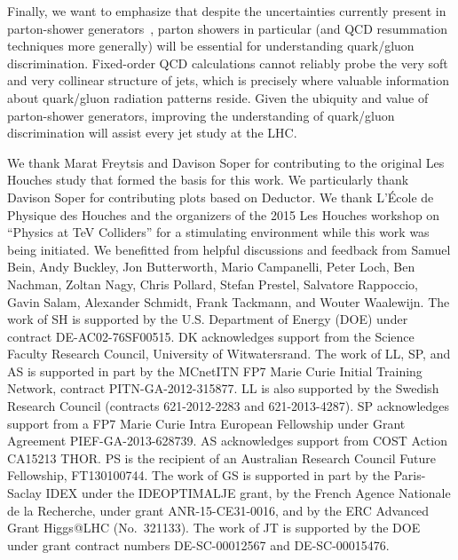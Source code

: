 \documentclass[11pt,letterpaper]{article}
\begin{document}
Finally, we want to emphasize that despite the uncertainties currently present in parton-shower generators~\cite{Bellm:2016rhh,Bellm:2016voq,Mrenna:2016sih,Bothmann:2016nao}, 
parton showers in particular (and QCD resummation techniques more generally) will be essential for understanding quark/gluon discrimination.  Fixed-order QCD calculations cannot reliably probe the very soft and very collinear structure of jets, which is precisely where valuable information about quark/gluon radiation patterns reside.  Given the ubiquity and value of parton-shower generators, improving the understanding of quark/gluon discrimination will assist every jet study at the LHC.

\begin{acknowledgments}

We thank Marat Freytsis and Davison Soper for contributing to the original Les Houches study \cite{Badger:2016bpw} that formed the basis for this work.  We particularly thank Davison Soper for contributing plots based on Deductor.
%
We thank L'\'{E}cole de Physique des Houches and the organizers of the 2015 Les Houches workshop on ``Physics at TeV Colliders'' for a stimulating environment while this work was being initiated.
%
We benefitted from helpful discussions and feedback from Samuel Bein, Andy Buckley, Jon Butterworth, Mario Campanelli, Peter Loch, Ben Nachman, Zoltan Nagy, Chris Pollard, Stefan Prestel, Salvatore Rappoccio, Gavin Salam, Alexander Schmidt, Frank Tackmann, and Wouter Waalewijn.
%
The work of SH is supported by the U.S. Department of Energy (DOE) under contract DE-AC02-76SF00515.
%
DK acknowledges support from the Science Faculty Research Council, University of Witwatersrand.
%
The work of LL, SP, and AS is supported in part by the MCnetITN FP7 Marie Curie Initial Training Network, contract PITN-GA-2012-315877.
%
LL is also supported by the Swedish Research Council (contracts 621-2012-2283 and 621-2013-4287).
%
SP acknowledges support from a FP7 Marie Curie Intra European Fellowship under Grant Agreement PIEF-GA-2013-628739.
%
AS acknowledges support from COST Action CA15213 THOR.
%
PS is the recipient of an Australian Research Council Future Fellowship, FT130100744.
% 
The work of GS is supported in part by the Paris-Saclay IDEX under the
IDEOPTIMALJE grant, by the French Agence Nationale de la Recherche,
under grant ANR-15-CE31-0016, and by the ERC Advanced Grant Higgs@LHC
(No.\ 321133).
%
The work of JT is supported by the DOE under grant contract numbers DE-SC-00012567 and DE-SC-00015476.

\end{acknowledgments}



\end{document}
